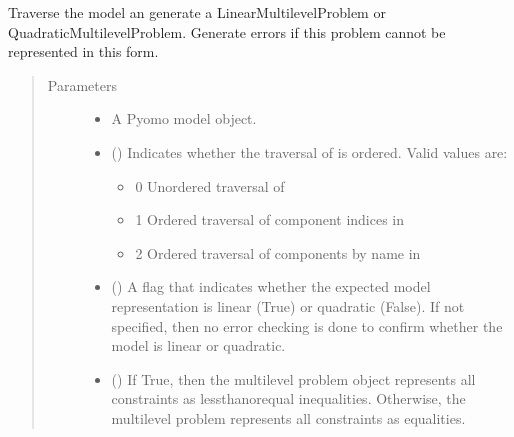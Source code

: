 \documentclass[letterpaper,10pt,english]{sphinxmanual}
\begin{document}
\begin{fulllineitems}
\label{\detokenize{reference/pyomo:pao.pyomo.convert.convert_pyomo2MultilevelProblem}}
Traverse the model an generate a LinearMultilevelProblem or
QuadraticMultilevelProblem.  Generate errors if this problem cannot
be represented in this form.
\begin{quote}\begin{description}
\item[{Parameters}] \leavevmode\begin{itemize}
\item {} 
 \textendash{} A Pyomo model object.

\item {} 
 (\sphinxstyleliteralemphasis{\sphinxupquote{, }}) \textendash{} 
Indicates whether the traversal of  is
ordered.  Valid values are:
\begin{itemize}
\item {} 
0 \sphinxhyphen{} Unordered traversal of 

\item {} 
1 \sphinxhyphen{} Ordered traversal of component indices in 

\item {} 
2 \sphinxhyphen{} Ordered traversal of components by name in 

\end{itemize}


\item {} 
 () \textendash{} A flag that indicates whether the expected model representation is linear (True) or
quadratic (False).  If not specified, then no error checking is done to confirm
whether the model is linear or quadratic.

\item {} 
 (\sphinxstyleliteralemphasis{\sphinxupquote{, }}) \textendash{} If True, then the multilevel problem object represents all
constraints as less\sphinxhyphen{}than\sphinxhyphen{}or\sphinxhyphen{}equal inequalities.  Otherwise,
the multilevel problem represents all constraints as equalities.


\end{itemize}
\end{description}
\end{quote}
\end{fulllineitems}
\end{document}
